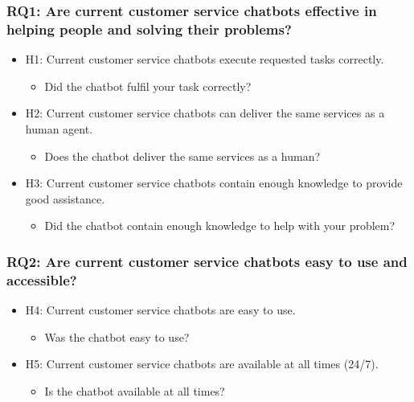 \subsubsection{RQ1: Are current customer service chatbots effective in helping people and solving their problems?}
\begin{itemize}
	\item H1: Current customer service chatbots execute requested tasks correctly.
	\begin{itemize}
		\item Did the chatbot fulfil your task correctly?
	\end{itemize}
	\item H2: Current customer service chatbots can deliver the same services as a human agent.
	\begin{itemize}
		\item Does the chatbot deliver the same services as a human?
	\end{itemize}
	\item H3: Current customer service chatbots contain enough knowledge to provide good assistance.
	\begin{itemize}
		\item Did the chatbot contain enough knowledge to help with your problem?
	\end{itemize}
\end{itemize}

\subsubsection{RQ2: Are current customer service chatbots easy to use and accessible?}
\begin{itemize}
	\item H4: Current customer service chatbots are easy to use.
	\begin{itemize}
		\item Was the chatbot easy to use?
	\end{itemize}
	\item H5: Current customer service chatbots are available at all times (24/7).
	\begin{itemize}
		\item Is the chatbot available at all times?
	\end{itemize}
\end{itemize}

